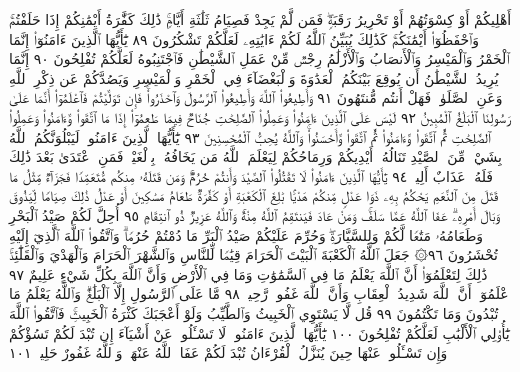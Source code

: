 أَهْلِيكُمْ أَوْ كِسْوَتُهُمْ أَوْ تَحْرِيرُ رَقَبَةࣲۖ فَمَن لَّمْ يَجِدْ فَصِيَامُ
ثَلَٰثَةِ أَيَّامࣲۚ ذَٰلِكَ كَفَّٰرَةُ أَيْمَٰنِكُمْ إِذَا حَلَفْتُمْۚ وَٱحْفَظُوٓا۟
أَيْمَٰنَكُمْۚ كَذَٰلِكَ يُبَيِّنُ ٱللَّهُ لَكُمْ ءَايَٰتِهِۦ لَعَلَّكُمْ تَشْكُرُونَ ٨٩
يَٰٓأَيُّهَا ٱلَّذِينَ ءَامَنُوٓا۟ إِنَّمَا ٱلْخَمْرُ وَٱلْمَيْسِرُ وَٱلْأَنصَابُ وَٱلْأَزْلَٰمُ
رِجْسࣱ مِّنْ عَمَلِ ٱلشَّيْطَٰنِ فَٱجْتَنِبُوهُ لَعَلَّكُمْ تُفْلِحُونَ ٩٠
إِنَّمَا يُرِيدُ ٱلشَّيْطَٰنُ أَن يُوقِعَ بَيْنَكُمُ ٱلْعَدَٰوَةَ وَٱلْبَغْضَآءَ
فِي ٱلْخَمْرِ وَٱلْمَيْسِرِ وَيَصُدَّكُمْ عَن ذِكْرِ ٱللَّهِ وَعَنِ
ٱلصَّلَوٰةِۖ فَهَلْ أَنتُم مُّنتَهُونَ ٩١ وَأَطِيعُوا۟ ٱللَّهَ وَأَطِيعُوا۟
ٱلرَّسُولَ وَٱحْذَرُوا۟ۚ فَإِن تَوَلَّيْتُمْ فَٱعْلَمُوٓا۟ أَنَّمَا عَلَىٰ رَسُولِنَا
ٱلْبَلَٰغُ ٱلْمُبِينُ ٩٢ لَيْسَ عَلَى ٱلَّذِينَ ءَامَنُوا۟ وَعَمِلُوا۟ ٱلصَّٰلِحَٰتِ
جُنَاحࣱ فِيمَا طَعِمُوٓا۟ إِذَا مَا ٱتَّقَوا۟ وَّءَامَنُوا۟ وَعَمِلُوا۟ ٱلصَّٰلِحَٰتِ
ثُمَّ ٱتَّقَوا۟ وَّءَامَنُوا۟ ثُمَّ ٱتَّقَوا۟ وَّأَحْسَنُوا۟ۚ وَٱللَّهُ يُحِبُّ
ٱلْمُحْسِنِينَ ٩٣ يَٰٓأَيُّهَا ٱلَّذِينَ ءَامَنُوا۟ لَيَبْلُوَنَّكُمُ ٱللَّهُ بِشَيْءࣲ
مِّنَ ٱلصَّيْدِ تَنَالُهُۥٓ أَيْدِيكُمْ وَرِمَاحُكُمْ لِيَعْلَمَ ٱللَّهُ مَن يَخَافُهُۥ
بِٱلْغَيْبِۚ فَمَنِ ٱعْتَدَىٰ بَعْدَ ذَٰلِكَ فَلَهُۥ عَذَابٌ أَلِيمࣱ ٩٤ يَٰٓأَيُّهَا
ٱلَّذِينَ ءَامَنُوا۟ لَا تَقْتُلُوا۟ ٱلصَّيْدَ وَأَنتُمْ حُرُمࣱۚ وَمَن قَتَلَهُۥ
مِنكُم مُّتَعَمِّدࣰا فَجَزَآءࣱ مِّثْلُ مَا قَتَلَ مِنَ ٱلنَّعَمِ يَحْكُمُ بِهِۦ ذَوَا
عَدْلࣲ مِّنكُمْ هَدْيَۢا بَٰلِغَ ٱلْكَعْبَةِ أَوْ كَفَّٰرَةࣱ طَعَامُ مَسَٰكِينَ
أَوْ عَدْلُ ذَٰلِكَ صِيَامࣰا لِّيَذُوقَ وَبَالَ أَمْرِهِۦۗ عَفَا ٱللَّهُ عَمَّا
سَلَفَۚ وَمَنْ عَادَ فَيَنتَقِمُ ٱللَّهُ مِنْهُۚ وَٱللَّهُ عَزِيزࣱ ذُو ٱنتِقَامٍ ٩٥
أُحِلَّ لَكُمْ صَيْدُ ٱلْبَحْرِ وَطَعَامُهُۥ مَتَٰعࣰا لَّكُمْ وَلِلسَّيَّارَةِۖ
وَحُرِّمَ عَلَيْكُمْ صَيْدُ ٱلْبَرِّ مَا دُمْتُمْ حُرُمࣰاۗ وَٱتَّقُوا۟ ٱللَّهَ ٱلَّذِيٓ
إِلَيْهِ تُحْشَرُونَ ٩٦۞ جَعَلَ ٱللَّهُ ٱلْكَعْبَةَ ٱلْبَيْتَ ٱلْحَرَامَ
قِيَٰمࣰا لِّلنَّاسِ وَٱلشَّهْرَ ٱلْحَرَامَ وَٱلْهَدْيَ وَٱلْقَلَٰٓئِدَۚ ذَٰلِكَ لِتَعْلَمُوٓا۟
أَنَّ ٱللَّهَ يَعْلَمُ مَا فِي ٱلسَّمَٰوَٰتِ وَمَا فِي ٱلْأَرْضِ وَأَنَّ ٱللَّهَ بِكُلِّ
شَيْءٍ عَلِيمٌ ٩٧ ٱعْلَمُوٓا۟ أَنَّ ٱللَّهَ شَدِيدُ ٱلْعِقَابِ وَأَنَّ ٱللَّهَ
غَفُورࣱ رَّحِيمࣱ ٩٨ مَّا عَلَى ٱلرَّسُولِ إِلَّا ٱلْبَلَٰغُۗ وَٱللَّهُ يَعْلَمُ مَا
تُبْدُونَ وَمَا تَكْتُمُونَ ٩٩ قُل لَّا يَسْتَوِي ٱلْخَبِيثُ وَٱلطَّيِّبُ
وَلَوْ أَعْجَبَكَ كَثْرَةُ ٱلْخَبِيثِۚ فَٱتَّقُوا۟ ٱللَّهَ يَٰٓأُو۟لِي ٱلْأَلْبَٰبِ
لَعَلَّكُمْ تُفْلِحُونَ ١٠٠ يَٰٓأَيُّهَا ٱلَّذِينَ ءَامَنُوا۟ لَا تَسْـَٔلُوا۟ عَنْ
أَشْيَآءَ إِن تُبْدَ لَكُمْ تَسُؤْكُمْ وَإِن تَسْـَٔلُوا۟ عَنْهَا حِينَ يُنَزَّلُ
ٱلْقُرْءَانُ تُبْدَ لَكُمْ عَفَا ٱللَّهُ عَنْهَاۗ وَٱللَّهُ غَفُورٌ حَلِيمࣱ ١٠١

